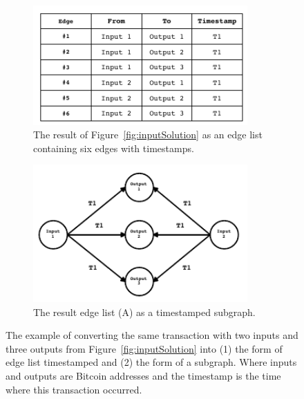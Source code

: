 \documentclass[../../thesis.tex]{subfiles}
\begin{document}
\begin{figure}
    \centering
    
    \begin{subfigure}{0.45\textwidth}
        \centering
        \includegraphics[width=0.9\textwidth]{content/unveiling/img/imput_solution_as_graph_edgelist}         
        \caption{The result of Figure~\ref{fig:inputSolution} as an edge list containing six edges with timestamps.}
        \label{fig:inputSolutionTableGraphA}
    \end{subfigure}\hfill
    \begin{subfigure}{0.45\textwidth}
        \centering
        \includegraphics[width=0.9\textwidth]{content/unveiling/img/imput_solution_as_graph}         
        \caption{The result edge list (A) as a timestamped subgraph.}
        \label{fig:inputSolutionTableGraphB}
    \end{subfigure}

\caption{The example of converting the same transaction with two inputs and three outputs from Figure~\ref{fig:inputSolution} into (1) the form of edge list timestamped and (2) the form of a subgraph. Where inputs and outputs are Bitcoin addresses and the timestamp is the time where this transaction occurred.} 
\label{fig:inputSolutionTableGraph}
\end{figure}
\end{document}
